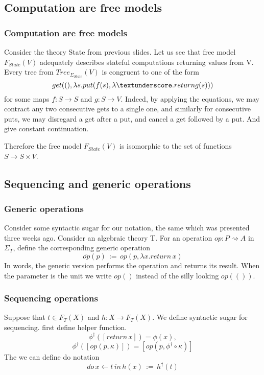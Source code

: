 \documentclass{beamer}
\begin{document}
    \subsection{Computation are free models}
    \begin{frame}
        \frametitle{Computation are free models}
        Consider the theory State from previous slides. Let us see that free model $F_{State}(V)$
        adequately describes stateful computations returning values from V.
        Every tree from $Tree_{\Sigma_{State}}(V)$ is congruent to one of the form 
        \[
          get((), \lambda s. put(f(s), \lambda \textunderscore. return g(s)))
        \]
        for some maps $f : S \rightarrow S$ and $g : S \rightarrow V$.
         Indeed, by applying the equations,
        we may contract any two consecutive gets to a single one, and similarly for
        consecutive puts, we may disregard a get after a put,
         and cancel a get followed by a put. And give constant continuation.

        Therefore the free model $F_{State}(V)$ is isomorphic to the set of functions $S \rightarrow S \times V$.
        
    
    \end{frame}
    \subsection{Sequencing and generic operations}
\begin{frame}
    \frametitle{Generic operations}

    Consider some syntactic sugar for our notation, the same which was presented three weeks ago.
    Consider an algebraic theory T. For an operation $op : P \rightsquigarrow A$ in $\Sigma_T$, define the
corresponding generic operation
\[
  \overline{op}(p) \, := \, op(p, \lambda x. return \, x)   
\]
In words, the generic version performs the operation and returns its result. When the
parameter is the unit we write $op()$ instead of the silly looking $op(())$. 
    

\end{frame}
\begin{frame}
    \frametitle{Sequencing operations}

    Suppose that 
    $t \in F_T(X)$ and $h : X \rightarrow F_T(X)$. We define syntactic sugar for sequencing. 
    first define helper function. 
    \[
        \phi^\dagger([return \, x]) = \phi(x),
    \] \[
        \phi^\dagger([op(p, \kappa)]) = [op(p, \phi^\dagger \circ \kappa)]
    \]
        The we can define do notation
    \[
      do \, x \leftarrow t \, in \, h(x) \, := \, h^\dagger(t)
      \]



\end{frame}
\end{document}
